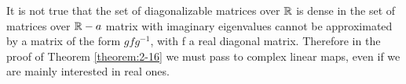 It is not true that the set of diagonalizable matrices over ${\mathbb{R}}$ is dense in the set of
matrices over ${\mathbb{R}} - a$ matrix with imaginary eigenvalues cannot be approximated
by a matrix of the form $gfg^{-1}$, with f a real diagonal matrix. Therefore in the
proof of Theorem \ref{theorem:2-16} we must pass to complex linear maps, even if we are
mainly interested in real ones.